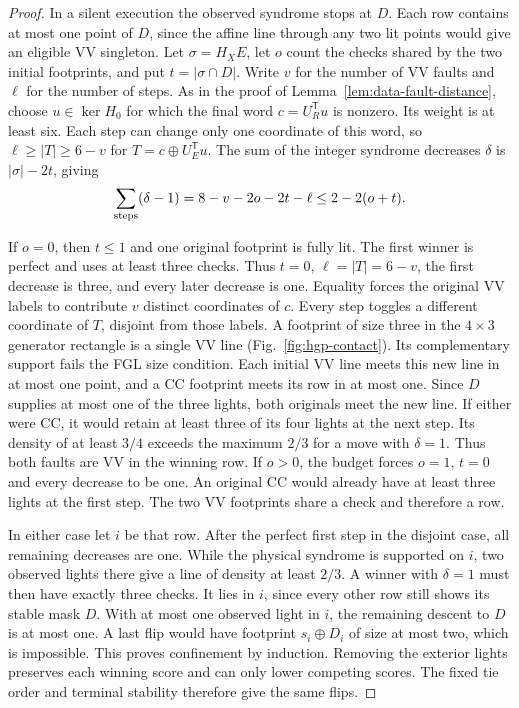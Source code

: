 \documentclass[10pt,twocolumn]{article}
\theoremstyle{definition}
\begin{document}
\begin{proof}
In a silent execution the observed syndrome stops at $D$. Each row
contains at most one point of $D$, since the affine line through any
two lit points would give an eligible VV singleton.
Let $\sigma=H_XE$, let $o$ count the checks shared by the two initial
footprints, and put $t=|\sigma\cap D|$. Write $v$ for the number of VV
faults and $\ell$ for the number of steps. As in the proof of
Lemma~\ref{lem:data-fault-distance}, choose $u\in\ker H_0$ for which the
final word $c=U_R^{\mathsf T}u$ is nonzero. Its weight is at least six.
Each step can change only one coordinate of this word, so
$\ell\ge |T|\ge6-v$ for $T=c\oplus U_E^{\mathsf T}u$. The sum of the
integer syndrome decreases $\delta$ is $|\sigma|-2t$, giving
\[
 \sum_{\rm steps}(\delta-1)=8-v-2o-2t-\ell\le2-2(o+t).
\]

If $o=0$, then $t\le1$ and one original footprint is fully lit.
The first winner is perfect and uses at least three checks. Thus
$t=0$, $\ell=|T|=6-v$, the first decrease is three, and every later
decrease is one. Equality forces the original VV labels to contribute
$v$ distinct coordinates of $c$. Every step toggles a different
coordinate of $T$, disjoint from those labels. A footprint of size
three in the $4\times3$ generator rectangle is a single VV line
(Fig.~\ref{fig:hgp-contact}). Its complementary support fails the
FGL size condition. Each initial VV line meets this new line in at
most one point, and a CC footprint meets its row in at most one.
Since $D$ supplies at most one of the three lights, both originals
meet the new line. If either were CC, it would retain at least three
of its four lights at the next step. Its density of at least $3/4$
exceeds the maximum $2/3$ for a move with $\delta=1$. Thus both
faults are VV in the winning row. If $o>0$, the budget forces
$o=1$, $t=0$ and every decrease to be one. An original CC would
already have at least three lights at the first step. The two VV
footprints share a check and therefore a row.

In either case let $i$ be that row. After the perfect first step
in the disjoint case, all remaining decreases are one. While the
physical syndrome is supported on $i$, two observed lights there
give a line of density at least $2/3$. A winner with $\delta=1$
must then have exactly three checks. It lies in $i$, since every
other row still shows its stable mask $D$. With at most one
observed light in $i$, the remaining descent to $D$ is at most one.
A last flip would have footprint $s_i\oplus D_i$ of size at most
two, which is impossible. This proves confinement by induction.
Removing the exterior lights preserves each winning score and can
only lower competing scores. The fixed tie order and terminal
stability therefore give the same flips.


\end{proof}
\end{document}
